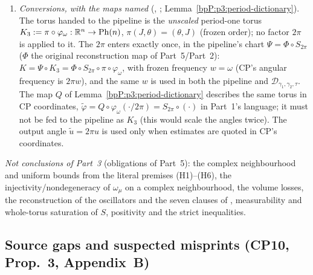 \begin{enumerate}[label=(\arabic*)]
\item \emph{Conversions, with the maps named} (, ; Lemma~\ref{bpP:p3:period-dictionary}). The torus handed to the pipeline is the \emph{unscaled} period-one torus $K_3:=\pi\circ\varphi_\omega:\mathbb{R}^n\to\mathrm{Ph}(n)$, $\pi(J,\theta)=(\theta,J)$ (frozen order); no factor $2\pi$ is applied to it. The $2\pi$ enters exactly once, in the pipeline's chart $\Psi=\Phi\circ S_{2\pi}$ ($\Phi$ the original reconstruction map of Part~5/Part~2): $K=\Psi\circ K_3=\Phi\circ S_{2\pi}\circ\pi\circ\varphi_\omega$, with frozen frequency $w=\omega$ (CP's angular frequency is $2\pi w$), and the same $w$ is used in both the pipeline and $\mathcal D_{\gamma_1,\gamma_2,\tau}$. The map $Q$ of Lemma~\ref{bpP:p3:period-dictionary} describes the same torus in CP coordinates, $\tilde\varphi=Q\circ\varphi_\omega(\cdot/2\pi)=S_{2\pi}\circ(\cdot)$ in Part~1's language; it must not be fed to the pipeline as $K_3$ (this would scale the angles twice). The output angle $\tilde u=2\pi u$ is used only when estimates are quoted in CP's coordinates.
\end{enumerate}
\emph{Not conclusions of Part~3} (obligations of Part~5): the complex neighbourhood and uniform bounds from the literal premises (H1)--(H6), the injectivity/nondegeneracy of $\omega_\mu$ on a complex neighbourhood, the volume losses, the reconstruction of the oscillators and the seven clauses of , measurability and whole-torus saturation of $S$, positivity and the strict inequalities.

\subsection{Source gaps and suspected misprints (CP10, Prop.~3, Appendix~B)}\label{bpP:p3:errata}

